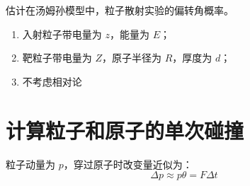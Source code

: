 \documentclass{ctexart}
\begin{document}
估计在汤姆孙模型中，粒子散射实验的偏转角概率。

\begin{enumerate}

    \item 入射粒子带电量为 $z$，能量为 $E$；
    \item 靶粒子带电量为 $Z$，原子半径为 $R$，厚度为 $d$；
    \item 不考虑相对论
    
\end{enumerate}

\part{计算粒子和原子的单次碰撞}


粒子动量为 $p$，穿过原子时改变量近似为：
$$
\Delta p \approx p \theta = F \Delta t
$$
\end{document}
